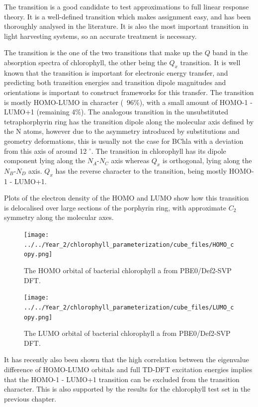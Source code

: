 The \Qy transition is a good candidate to test approximations to full linear response 
theory. It is a well-defined transition which makes assignment easy, and has been
thoroughly analysed in the literature. It is also the most important transition 
in light harvesting systems, so an accurate treatment is necessary. 

The \Qy transition is the one of the two transitions that make up the $Q$ band in
the absorption spectra of chlorophyll, the other being the $Q_x$ transition. It 
is well known that the \Qy transition is important for electronic energy transfer,
and predicting both transition energies and transition dipole magnitudes and orientations
is important to construct frameworks for this transfer. The \Qy transition is mostly
HOMO-LUMO in character (~96\%), with a small amount of HOMO-1 - LUMO+1 (remaining 4\%).
The analogous transition in the unsubstituted tetraphorphyrin ring has the transition
dipole along the molecular axis defined by the N atoms, however due to the asymmetry 
introduced by substitutions and geometry deformations, this is usually not the case 
for BChla with a deviation from this axis of around 12 $^{\circ}$. The \Qy transition
in chlorophyll has its dipole component lying along the $N_A$-$N_C$ axis whereas
$Q_x$ is orthogonal, lying along the $N_B$-$N_D$ axis. $Q_x$ has the reverse
character to the \Qy transition, being mostly HOMO-1 - LUMO+1.

Plots of the electron density of the HOMO and LUMO show how
this transition is delocalised over large sections of the porphyrin ring, with 
approximate $C_2$ symmetry along the molecular axes.

\begin{figure}
    \centering
    \texttt{[image: ../../Year\_2/chlorophyll\_parameterization/cube\_files/HOMO\_copy.png]}
    \caption{The HOMO orbital of bacterial chlorophyll a from PBE0/Def2-SVP DFT.}
    \label{fig:HOMO}
\end{figure}

\begin{figure}
    \centering
    \texttt{[image: ../../Year\_2/chlorophyll\_parameterization/cube\_files/LUMO\_copy.png]}
    \caption{The LUMO orbital of bacterial chlorophyll a from PBE0/Def2-SVP DFT.}
\end{figure}

It has recently also been shown that the high correlation between the eigenvalue
difference of HOMO-LUMO orbitals and full TD-DFT excitation energies implies that
the HOMO-1 - LUMO+1 transition can be excluded from the transition character. This
is also supported by the results for the chlorophyll test set in the previous chapter.

